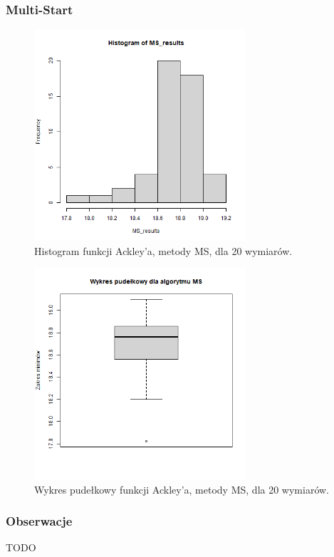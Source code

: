 \documentclass{lab}
\begin{document}
\subsubsection{Multi-Start}
\begin{figure}[H]
  \centering
  \includegraphics[width=0.7\textwidth]{img/dim20_MS_Ackley_his.png}
  \caption{Histogram funkcji Ackley'a, metody MS, dla 20 wymiarów.}
\end{figure}
\begin{figure}[H]
  \centering
  \includegraphics[width=0.7\textwidth]{img/dim20_MS_Ackley.png}
  \caption{Wykres pudełkowy funkcji Ackley'a, metody MS, dla 20 wymiarów.}
\end{figure}

\subsubsection{Obserwacje}
TODO
\end{document}
